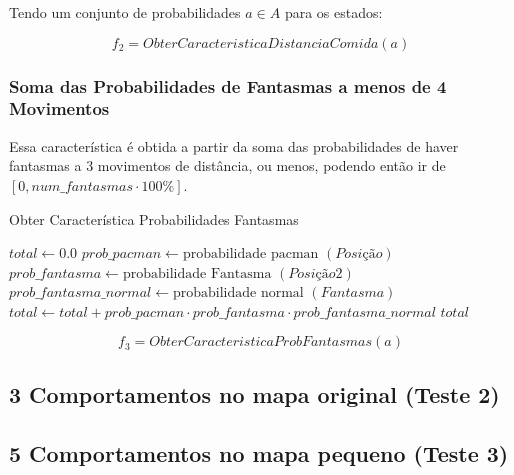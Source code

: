Tendo um conjunto de probabilidades $ a \in A $ para os estados:

$$ f_2 = ObterCaracteristicaDistanciaComida \left( a \right) $$

\subsubsection*{Soma das Probabilidades de Fantasmas a menos de 4 Movimentos}

Essa característica é obtida a partir da soma das probabilidades de haver fantasmas a 3 movimentos de distância, ou menos, podendo então ir de $ \left[ 0, num\_fantasmas \cdot 100\% \right] $.

\begin{algorithm}[H]
	\caption{Obter Característica Probabilidades Fantasmas} \label{algorithm:ObterCaracteristicaProbabilidadesFantasmas}
	\begin{algorithmic}[1]
			\State $\textit{total} \gets 0.0 $
						\State $\textit{prob\_pacman} \gets \text{probabilidade pacman } \left( \textit{Posição} \right) $
							\State $\textit{prob\_fantasma} \gets \text{probabilidade Fantasma } \left( \textit{Posição2} \right) $
							\State $\textit{prob\_fantasma\_normal} \gets \text{probabilidade normal } \left( \textit{Fantasma} \right) $
							\State $\textit{total} \gets \textit{total} + \textit{prob\_pacman}  \cdot \textit{prob\_fantasma} \cdot \textit{prob\_fantasma\_normal} $
						\EndFor
					\EndIf
				\EndFor
			\EndFor
			\State \Return $ \textit{total} $
		\EndProcedure
	\end{algorithmic}
\end{algorithm}

$$ f_3 = ObterCaracteristicaProbFantasmas \left( a \right) $$


\subsection{3 Comportamentos no mapa original (Teste 2)}

\subsection{5 Comportamentos no mapa pequeno (Teste 3)}

